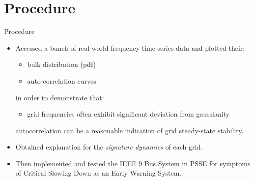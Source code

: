 \section[Procedure]{Procedure}
\label{sec:procedure}

\begin{frame}{Procedure}
	\begin{itemize}
		\item Accessed a bunch of real-world frequency time-series data and plotted their:
			\begin{itemize}
				\item bulk distribution (pdf) 
				\item auto-correlation curves
			\end{itemize}
		in order to demonstrate that:
			\begin{itemize}
				\item grid frequencies often exhibit significant deviation from gaussianity
			\end{itemize} autocorrelation can be a reasonable indication of grid steady-state stability.
		\item Obtained explanation for the \textit{signature dynamics}	of each grid.
		\item Then implemented and tested the IEEE 9 Bus System in PSSE for symptoms of Critical Slowing Down as an Early Warning System. 		
	\end{itemize}
\end{frame}
